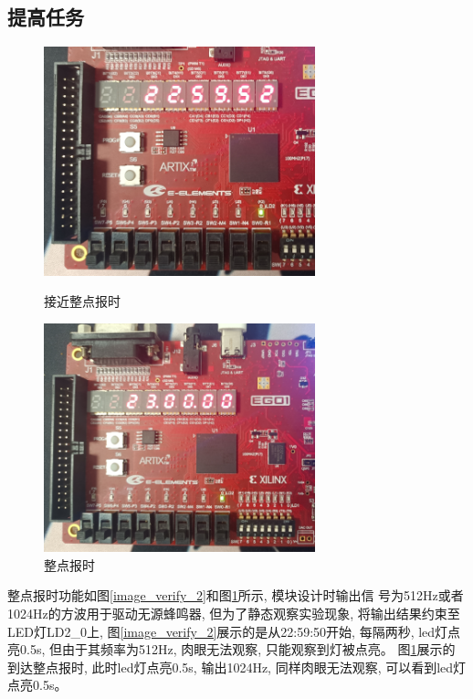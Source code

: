 \documentclass{article}
\begin{document}
\subsection*{提高任务}
\begin{figure}[H]
    \begin{minipage}[t]{0.45\linewidth}
        \centering
        \includegraphics[width=0.7\textwidth]{image/2024-06-26-08-54-42.png}
        \caption{接近整点报时}
        \label{image_verify_2}
    \end{minipage}
    \begin{minipage}[t]{0.45\linewidth}
        \centering
        \includegraphics[width=0.7\textwidth]{image/2024-06-26-08-54-17.png}
        \caption{整点报时}
        \label{image_verify_3}
    \end{minipage}
\end{figure}
整点报时功能如图\ref{image_verify_2}和图\ref{image_verify_3}所示, 模块设计时输出信
号为512Hz或者1024Hz的方波用于驱动无源蜂鸣器, 但为了静态观察实验现象, 将输出结果约束至
LED灯LD2\_0上, 图\ref{image_verify_2}展示的是从22:59:50开始, 每隔两秒, led灯点亮0.5s,
但由于其频率为512Hz, 肉眼无法观察, 只能观察到灯被点亮。 图\ref{image_verify_3}展示的
到达整点报时, 此时led灯点亮0.5s, 输出1024Hz, 同样肉眼无法观察, 可以看到led灯点亮0.5s。
\end{document}
